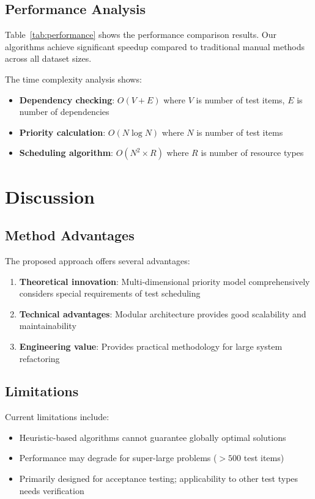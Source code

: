 \documentclass[journal]{IEEEtran}
\begin{document}
\subsection{Performance Analysis}
Table~\ref{tab:performance} shows the performance comparison results. Our algorithms achieve significant speedup compared to traditional manual methods across all dataset sizes.

The time complexity analysis shows:
\begin{itemize}
\item \textbf{Dependency checking}: $O(V + E)$ where $V$ is number of test items, $E$ is number of dependencies
\item \textbf{Priority calculation}: $O(N \log N)$ where $N$ is number of test items  
\item \textbf{Scheduling algorithm}: $O(N^2 \times R)$ where $R$ is number of resource types
\end{itemize}

\section{Discussion}

\subsection{Method Advantages}
The proposed approach offers several advantages:
\begin{enumerate}
\item \textbf{Theoretical innovation}: Multi-dimensional priority model comprehensively considers special requirements of test scheduling
\item \textbf{Technical advantages}: Modular architecture provides good scalability and maintainability
\item \textbf{Engineering value}: Provides practical methodology for large system refactoring
\end{enumerate}

\subsection{Limitations}
Current limitations include:
\begin{itemize}
\item Heuristic-based algorithms cannot guarantee globally optimal solutions
\item Performance may degrade for super-large problems ($>500$ test items)
\item Primarily designed for acceptance testing; applicability to other test types needs verification
\end{itemize}
\end{document}
